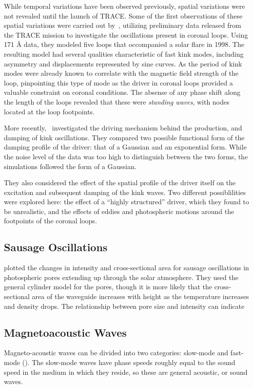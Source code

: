\documentclass[preprint2]{aastex}
\begin{document}
While temporal variations have been observed previously,
spatial variations were not revealed until the launch of
TRACE\@.
Some of the first observations of these spatial variations
were carried out by~\cite{kink_1},
utilizing preliminary data released from the TRACE mission
to investigate the oscillations present in coronal loops.
Using 171 \AA{} data, they modeled five loops
that occompanied a solar flare in 1998.
The resulting model had several qualities characteristic of
fast kink modes, including asymmetry and
displacements represented by sine curves.
As the period of kink modes were already known to correlate
with the magnetic field strength of the loop, pinpointing this
type of mode as the driver in coronal loops provided a valuable
constraint on coronal conditions.
The absense of any phase
shift along the length of the loops revealed that these were
\emph{standing waves}, with nodes located at the loop footpoints.

More recently,~\cite{kink_2} investigated the driving mechanism
behind the production, and damping of kink oscillations.
They compared two possible functional form of the damping profile
of the driver: that of a Gaussian and an exponential form.
While the noise level of the data was too high to distinguish
between the two forms, the simulations followed the form of a
Gaussian.

They also considered the effect of the spatial profile of the driver
itself on the excitation and subsequent damping of the kink
waves. Two different possiblilities were explored here:
the effect of a ``highly structured'' driver, which they
found to be unrealistic, and the effects of eddies and photospheric
motions around the footpoints of the coronal loops.

\subsection{Sausage Oscillations}
\cite{sausage_1} plotted the changes in intensity and cross-sectional
area for sausage oscillations in photospheric pores extending up
through the solar atmosphere. They used the general cylinder model for
the pores, though it is more likely that the cross-sectional area of
the waveguide increases with height as the temperature increases and
density drops. The relationship between pore size and intensity can
indicate

\subsection{Magnetoacoustic Waves}
Magneto-acoustic waves can be divided into two categories:
slow-mode and fast-mode (\cite{Asc}).
The slow-mode waves have phase speeds roughly equal to the sound speed
in the medium in which they reside, so these are general acoustic, or
sound waves.
\end{document}
